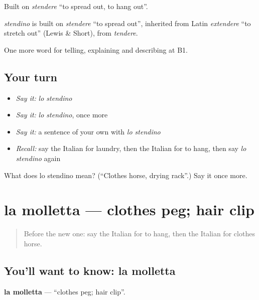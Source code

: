 Built on \emph{stendere} \textquotedblleft{}to spread out, to hang out\textquotedblright{}.

\begin{cousinweb}
\emph{stendino} is built on \emph{stendere} \textquotedblleft{}to spread out\textquotedblright{}, inherited from Latin \emph{extendere} \textquotedblleft{}to stretch out\textquotedblright{} (Lewis \& Short), from \emph{tendere}.
\end{cousinweb}

\begin{grammarlens}[title={What you've built}]
One more word for telling, explaining and describing at B1.
\end{grammarlens}

\subsection*{Your turn}
\begin{itemize}
\raggedright
  \item \emph{Say it:} \emph{lo stendino}
  \item \emph{Say it:} \emph{lo stendino}, once more
  \item \emph{Say it:} a sentence of your own with \emph{lo stendino}
  \item \emph{Recall:} say the Italian for laundry, then the Italian for to hang, then say \emph{lo stendino} again
\end{itemize}

\begin{tcolorbox}[breakable,colback=teal!4,colframe=teal!35!black,title={Before you move on}]
What does lo stendino mean? (\textquotedblleft{}Clothes horse, drying rack\textquotedblright{}.) Say it once more.
\end{tcolorbox}
\section[la molletta]{la molletta — clothes peg; hair clip}

\label{lesson:IT-C531-molletta}



\begin{quote}
Before the new one: say the Italian for to hang, then the Italian for clothes horse.
\end{quote}

\subsection*{You'll want to know: la molletta}
\textbf{la molletta} — \textquotedblleft{}clothes peg; hair clip\textquotedblright{}.

